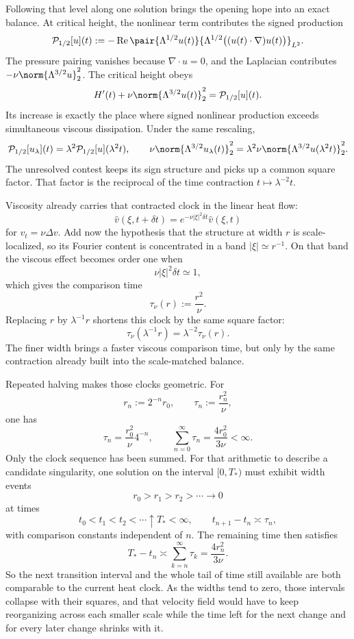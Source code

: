 
Following that level along one solution brings the opening hope into an exact balance. At critical height, the nonlinear term contributes the signed production
\[
  \mathcal P_{1/2}[u](t)
  :=
  -\operatorname{Re}
  \pair
    {\Lambda^{1/2}u(t)}
    {\Lambda^{1/2}\bigl((u(t)\cdot\nabla)u(t)\bigr)}_{L^2}.
\]
The pressure pairing vanishes because \(\nabla\cdot u=0\), and the Laplacian contributes \(-\nu\norm{\Lambda^{3/2}u}_2^2\). The critical height obeys
\[
  H'(t)
  +
  \nu\norm{\Lambda^{3/2}u(t)}_2^2
  =
  \mathcal P_{1/2}[u](t).
\]
Its increase is exactly the place where signed nonlinear production exceeds simultaneous viscous dissipation. Under the same rescaling,
\[
  \mathcal P_{1/2}[u_\lambda](t)
  =
  \lambda^2\mathcal P_{1/2}[u](\lambda^2t),
  \qquad
  \nu\norm{\Lambda^{3/2}u_\lambda(t)}_2^2
  =
  \lambda^2\nu\norm{\Lambda^{3/2}u(\lambda^2t)}_2^2.
\]
The unresolved contest keeps its sign structure and picks up a common square factor. That factor is the reciprocal of the time contraction \(t\mapsto\lambda^{-2}t\).


Viscosity already carries that contracted clock in the linear heat flow:
\[
  \widehat v(\xi,t+\delta t)
  =
  e^{-\nu|\xi|^2\delta t}\widehat v(\xi,t)
\]
for \(v_t=\nu\Delta v\). Add now the hypothesis that the structure at width \(r\) is scale-localized, so its Fourier content is concentrated in a band \(|\xi|\simeq r^{-1}\). On that band the viscous effect becomes order one when
\[
  \nu|\xi|^2\delta t\simeq1,
\]
which gives the comparison time
\[
  \tau_\nu(r)
  :=
  \frac{r^2}{\nu}.
\]
Replacing \(r\) by \(\lambda^{-1}r\) shortens this clock by the same square factor:
\[
  \tau_\nu(\lambda^{-1}r)
  =
  \lambda^{-2}\tau_\nu(r).
\]
The finer width brings a faster viscous comparison time, but only by the same contraction already built into the scale-matched balance.


Repeated halving makes those clocks geometric. For
\[
  r_n:=2^{-n}r_0,
  \qquad
  \tau_n:=\frac{r_n^2}{\nu},
\]
one has
\[
  \tau_n
  =
  \frac{r_0^2}{\nu}4^{-n},
  \qquad
  \sum_{n=0}^{\infty}\tau_n
  =
  \frac{4r_0^2}{3\nu}
  <
  \infty.
\]
Only the clock sequence has been summed. For that arithmetic to describe a candidate singularity, one \NavierStokes{} solution on the interval \([0,T_*)\) must exhibit width events
\[
  r_0>r_1>r_2>\cdots\longrightarrow0
\]
at times
\[
  t_0<t_1<t_2<\cdots\uparrow T_*<\infty,
  \qquad
  t_{n+1}-t_n\asymp\tau_n,
\]
with comparison constants independent of \(n\). The remaining time then satisfies
\[
  T_*-t_n
  \asymp
  \sum_{k=n}^{\infty}\tau_k
  =
  \frac{4r_n^2}{3\nu}.
\]
So the next transition interval and the whole tail of time still available are both comparable to the current heat clock. As the widths tend to zero, those intervals collapse with their squares, and that velocity field would have to keep reorganizing across each smaller scale while the time left for the next change and for every later change shrinks with it.